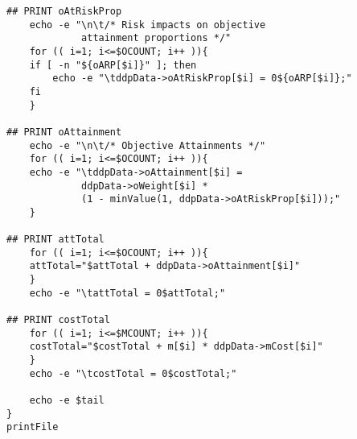 \begin{tiny}
\begin{verbatim}
## PRINT oAtRiskProp
    echo -e "\n\t/* Risk impacts on objective
             attainment proportions */"
    for (( i=1; i<=$OCOUNT; i++ )){
	if [ -n "${oARP[$i]}" ]; then
	    echo -e "\tddpData->oAtRiskProp[$i] = 0${oARP[$i]};"
	fi
    }

## PRINT oAttainment
    echo -e "\n\t/* Objective Attainments */"
    for (( i=1; i<=$OCOUNT; i++ )){
	echo -e "\tddpData->oAttainment[$i] =
	         ddpData->oWeight[$i] *
	         (1 - minValue(1, ddpData->oAtRiskProp[$i]));"
    }

## PRINT attTotal
    for (( i=1; i<=$OCOUNT; i++ )){
	attTotal="$attTotal + ddpData->oAttainment[$i]"
    }
    echo -e "\tattTotal = 0$attTotal;"

## PRINT costTotal
    for (( i=1; i<=$MCOUNT; i++ )){
	costTotal="$costTotal + m[$i] * ddpData->mCost[$i]"
    }
    echo -e "\tcostTotal = 0$costTotal;"

    echo -e $tail
}
printFile

\end{verbatim}
\end{tiny}
